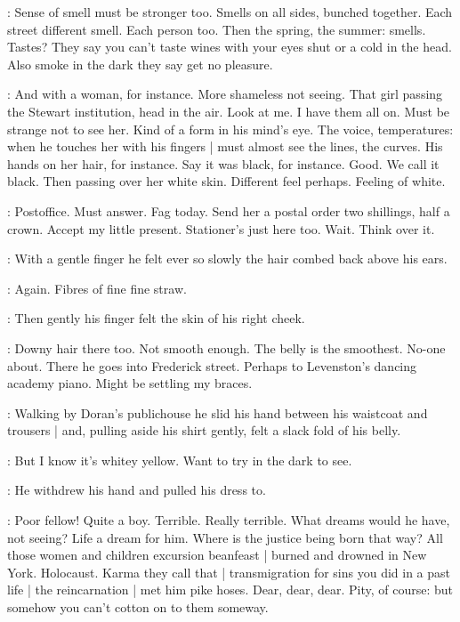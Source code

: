 \BloomInt:
Sense of smell must be stronger too.
Smells on all sides, bunched together.
Each street different smell.
Each person too.
Then the spring, the summer:
smells.
Tastes?
They say you can't taste wines with your eyes shut or a cold in the head.
Also smoke in the dark they say get no pleasure.

\BloomInt:
And with a woman, for instance.
More shameless not seeing.
That girl passing the Stewart institution,
head in the air.
Look at me.
I have them all on.
Must be strange not to see her.
Kind of a form in his mind's eye.
The voice, temperatures:
when he touches her with his fingers |
must almost see the lines, the curves.
His hands on her hair, for instance.
Say it was black, for instance.
Good.
We call it black.
Then passing over her white skin.
Different feel perhaps.
Feeling of white.

\BloomInt:
Postoffice.
Must answer.
Fag today.
Send her a postal order
two shillings, half a crown.
Accept my little present.
Stationer's just here too.
Wait.
Think over it.

:
With a gentle finger
he felt ever so slowly the hair combed back above his ears.

\BloomInt:
Again.
Fibres of fine fine straw.

:
Then gently his finger felt
the skin of his right cheek.

\BloomInt:
Downy hair there too.
Not smooth enough.
The belly is the smoothest.
No-one about.
There he goes into Frederick street.
Perhaps to Levenston's dancing academy piano.
Might be settling my braces.

:
Walking by Doran's publichouse
he slid his hand between his waistcoat and trousers |
and, pulling aside his shirt gently,
felt a slack fold of his belly.

\BloomInt:
But I know it's whitey yellow.
Want to try in the dark to see.

:
He withdrew his hand and pulled his dress to.

\BloomInt:
Poor fellow!
Quite a boy.
Terrible.
Really terrible.
What dreams would he have,
not seeing?
Life a dream for him.
Where is the justice being born that way?
All those women and children excursion beanfeast |
burned and drowned in New York.
Holocaust.
Karma they call that |
transmigration for sins you did in a past life |
the reincarnation |
met him pike hoses.
Dear, dear, dear.
Pity, of course:
but somehow you can't cotton on to them someway.%

